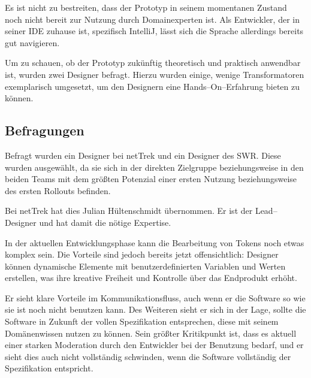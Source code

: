 Es ist nicht zu bestreiten, dass der Prototyp in seinem momentanen Zustand noch nicht bereit zur Nutzung durch Domainexperten ist.
Als Entwickler, der in seiner \ac{IDE} zuhause ist, spezifisch IntelliJ, lässt sich die Sprache allerdings bereits gut navigieren.

Um zu schauen, ob der Prototyp zukünftig theoretisch und praktisch anwendbar ist, wurden zwei Designer befragt.
Hierzu wurden einige, wenige Transformatoren exemplarisch umgesetzt, um den Designern eine Hands--On--Erfahrung bieten zu können.

\subsection{Befragungen}\label{subsec:befragungen}
Befragt wurden ein Designer bei \ac{netTrek} und ein Designer des \ac{SWR}.
Diese wurden ausgewählt, da sie sich in der direkten Zielgruppe beziehungsweise in den beiden Teams mit dem größten Potenzial einer ersten Nutzung beziehungsweise des ersten Rollouts befinden.

Bei \ac{netTrek} hat dies Julian Hültenschmidt übernommen.
Er ist der Lead--Designer und hat damit die nötige Expertise.
\begin{displayquote}
    In der aktuellen Entwicklungsphase kann die Bearbeitung von Tokens noch etwas komplex sein.
    Die Vorteile sind jedoch bereits jetzt offensichtlich: Designer können dynamische Elemente mit benutzerdefinierten Variablen und Werten erstellen, was ihre kreative Freiheit und Kontrolle über das Endprodukt erhöht.
\end{displayquote}
Er sieht klare Vorteile im Kommunikationsfluss, auch wenn er die Software so wie sie ist noch nicht benutzen kann.
Des Weiteren sieht er sich in der Lage, sollte die Software in Zukunft der vollen Spezifikation entsprechen, diese mit seinem Domänenwissen nutzen zu können.
Sein größter Kritikpunkt ist, dass es aktuell einer starken Moderation durch den Entwickler bei der Benutzung bedarf, und er sieht dies auch nicht vollständig schwinden, wenn die Software vollständig der Spezifikation entspricht.

